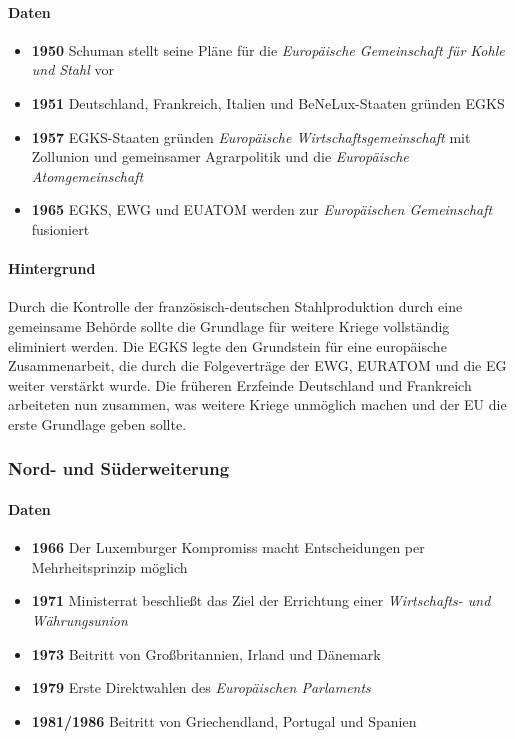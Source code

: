 \documentclass{article}
\begin{document}
	\paragraph{Daten}
	\begin{itemize}
		\item \textbf{1950} Schuman stellt seine Pläne für die \textit{Europäische Gemeinschaft für Kohle und Stahl} vor
		\item \textbf{1951} Deutschland, Frankreich, Italien und BeNeLux-Staaten gründen EGKS
		\item \textbf{1957} EGKS-Staaten gründen \textit{Europäische Wirtschaftsgemeinschaft} mit Zollunion und gemeinsamer Agrarpolitik und die \textit{Europäische Atomgemeinschaft}
		\item \textbf{1965} EGKS, EWG und EUATOM werden zur \textit{Europäischen Gemeinschaft} fusioniert
	\end{itemize}

	\paragraph{Hintergrund}
	Durch die Kontrolle der französisch-deutschen Stahlproduktion durch eine gemeinsame Behörde sollte die Grundlage für weitere Kriege vollständig eliminiert werden. Die EGKS legte den Grundstein für eine europäische Zusammenarbeit, die durch die Folgeverträge der EWG, EURATOM und die EG weiter verstärkt wurde. Die früheren Erzfeinde Deutschland und Frankreich arbeiteten nun zusammen, was weitere Kriege unmöglich machen und der EU die erste Grundlage geben sollte.

	\subsubsection{Nord- und Süderweiterung}
	\paragraph{Daten}
	\begin{itemize}
		\item \textbf{1966} Der Luxemburger Kompromiss macht Entscheidungen per Mehrheitsprinzip möglich
		\item \textbf{1971} Ministerrat beschließt das Ziel der Errichtung einer \textit{Wirtschafts- und Währungsunion}
		\item \textbf{1973} Beitritt von Großbritannien, Irland und Dänemark
		\item \textbf{1979} Erste Direktwahlen des \textit{Europäischen Parlaments}
		\item \textbf{1981/1986} Beitritt von Griechendland, Portugal und Spanien
	\end{itemize}
\end{document}
